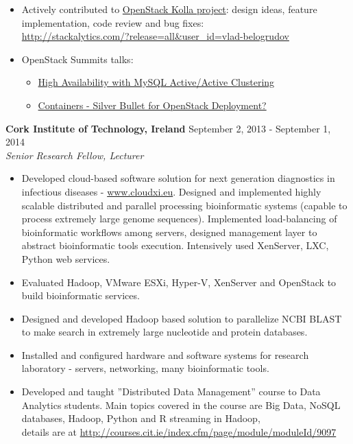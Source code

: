 \documentclass[a4paper,12pt,]{article}
\begin{document}
\begin{description}
\begin{itemize}
    \item Actively contributed to \href{https://docs.openstack.org/developer/kolla-ansible}{OpenStack Kolla project}: design ideas, feature implementation, code review and bug fixes:\\
       \url{http://stackalytics.com/?release=all&user_id=vlad-belogrudov}

    \item OpenStack Summits talks:
       \begin{itemize}
       \item \href{https://youtu.be/RJf7cwkytOE}{High Availability with MySQL Active/Active Clustering}
       \item \href{https://youtu.be/wzN3RHnVWdQ}{Containers - Silver Bullet for OpenStack Deployment?}
       \end{itemize}
    \end{itemize}

  \item{\bfseries Cork Institute of Technology, Ireland} \hfill September 2, 2013 - September 1, 2014 \\
    {\em Senior Research Fellow, Lecturer}

    \begin{itemize}

    \item Developed cloud-based software solution for next generation diagnostics in infectious diseases - \url{www.cloudxi.eu}. Designed and implemented highly scalable distributed and parallel processing bioinformatic systems (capable to process extremely large genome sequences). Implemented load-balancing of bioinformatic workflows among servers, designed management layer to abstract bioinformatic tools execution. Intensively used XenServer, LXC, Python web services.

    \item Evaluated Hadoop, VMware ESXi, Hyper-V, XenServer and OpenStack to build bioinformatic services.

    \item Designed and developed Hadoop based solution to parallelize NCBI BLAST to make search in extremely large nucleotide and protein databases.

    \item Installed and configured hardware and software systems for research laboratory - servers, networking, many bioinformatic tools.

    \item Developed and taught ”Distributed Data Management” course to Data Analytics students. Main topics covered in the course are Big Data, NoSQL databases, Hadoop, Python and R streaming in Hadoop, \\
             details are at \url{http://courses.cit.ie/index.cfm/page/module/moduleId/9097}


\end{itemize}
\end{description}
\end{document}
